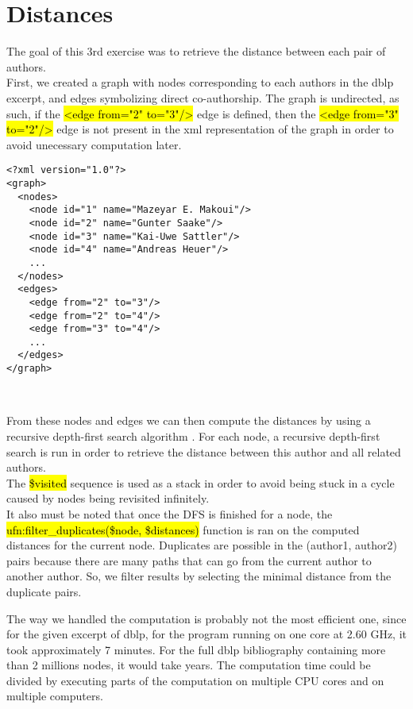 \section{Distances}

\noindent The goal of this 3rd exercise was to retrieve the distance between
each pair of authors.\\

First, we created a graph with nodes corresponding to each authors in the dblp
excerpt, and edges symbolizing direct co-authorship. The graph is undirected,
as such, if the \hl{<edge from="2" to="3"/>} edge is defined, then the
\hl{<edge from="3" to="2"/>} edge is not present in the xml representation of the
graph in order to avoid unecessary computation later.\\

\begin{lstlisting}[caption=Example of generated graph]
<?xml version="1.0"?>
<graph>
  <nodes>
    <node id="1" name="Mazeyar E. Makoui"/>
    <node id="2" name="Gunter Saake"/>
    <node id="3" name="Kai-Uwe Sattler"/>
    <node id="4" name="Andreas Heuer"/>
    ...
  </nodes>
  <edges>
    <edge from="2" to="3"/>
    <edge from="2" to="4"/>
    <edge from="3" to="4"/>
    ...
  </edges>
</graph>
\end{lstlisting}
\

From these nodes and edges we can then compute the distances by using a
recursive depth-first search algorithm \cite{cite:sodfs}. For each node, a
recursive depth-first search is run in order to retrieve the distance between
this author and all related authors.\\

The \hl{\$visited} sequence is used as a stack in order to avoid being stuck in
a cycle caused by nodes being revisited infinitely.\\

It also must be noted that once the DFS is finished for a node, the
\hl{ufn:filter\_duplicates(\$node, \$distances)} function is ran on the computed
distances for the current node. Duplicates are possible in the
(author1, author2) pairs because there are many paths that can go from the
current author to another author. So, we filter results by selecting the minimal
distance from the duplicate pairs.\\

\begin{framewarning}
    The way we handled the computation is probably not the most efficient one,
    since for the given excerpt of dblp, for the program running on one core at
    2.60 GHz, it took approximately 7 minutes. For the full dblp bibliography
    containing more than 2 millions nodes, it would take years. The computation
    time could be divided by executing parts of the computation on multiple CPU
    cores and on multiple computers.
\end{framewarning}

\newpage
